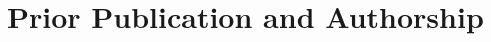 \begin{comment}
\section{Thesis outline}
This dissertation contributes new domain-specific languages (DSLs) for authoring
statistical analyses and a new theory describing the cognitive and operational
steps involved in authoring statistical analyses. In the process of designing
the second DSL, we also explored new methods for eliciting and integrating user
feedback throughout programming language design. The content of thesis is as
follows. 

\todo{Fill in this outline}

\section*{How to approach this dissertation} \todo{Decide if want to keep}
\end{comment}

\section{Prior Publication and Authorship} 